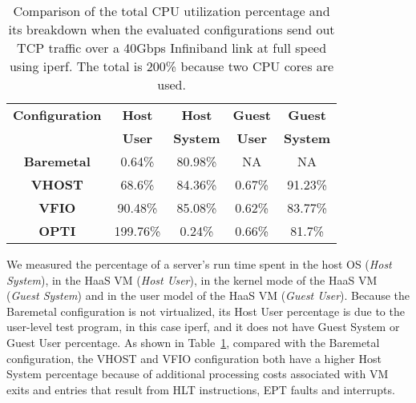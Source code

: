 \begin{table}
\renewcommand{\arraystretch}{1.2}
\small
\begin{center}
\begin{tabular}{|c|c|c|c|c|} \hline
{\bf Configuration} & {\bf Host } & {\bf Host } & {\bf Guest} & {\bf Guest} \\ 
{\bf } & {\bf  User } & {\bf System } & {\bf  User} & {\bf System} \\ \hline
 {\bf Baremetal}    & 0.64\%   & 80.98\% & NA & NA\\ \hline
 {\bf VHOST} & 68.6\%   & 84.36\% & 0.67\% & 91.23\% \\ \hline
{\bf VFIO}   & 90.48\%  & 85.08\% & 0.62\% & 83.77\% \\ \hline
 {\bf OPTI}  & 199.76\% & 0.24\%  & 0.66\% & 81.7\% \\ \hline 
\end{tabular}
\end{center}
\vspace{-0.1in}
\caption{Comparison of the total CPU utilization percentage and its breakdown 
when the evaluated configurations send out TCP traffic over a
40Gbps Infiniband link at full speed using iperf. The total is 200\% because two CPU cores are used.}
\label{tab:cpu_utilization_40gbps}
\vspace{-0.1in}
\end{table}

We measured the percentage of a \na server's run time spent in the host OS ({\em Host System}),
in the HaaS VM ({\em Host User}), in the kernel mode of the HaaS VM ({\em Guest System})
and in the user model  of the HaaS VM ({\em Guest User}).
Because  the Baremetal configuration is not virtualized, its Host User percentage is due to 
the user-level test program, in this case iperf, and it does not have Guest System or 
Guest User percentage.
As shown in Table~\ref{tab:cpu_utilization_40gbps}, compared with the Baremetal configuration, 
the VHOST and VFIO configuration both have a higher Host System percentage because of additional 
processing costs associated with VM exits and entries that result from HLT instructions, EPT faults and interrupts.

